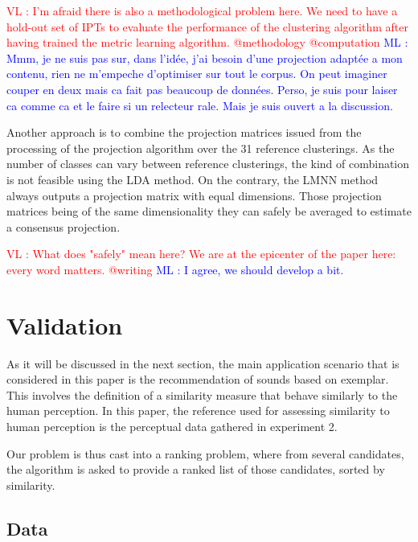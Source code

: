 \documentclass{article}
\newcommand{\ml}[1]{\textcolor{blue}{ML : #1}}
\newcommand{\vl}[1]{\textcolor{red}{VL : #1}}
\begin{document}
\vl{I'm afraid there is also a methodological problem here.
We need to have a hold-out set of IPTs to evaluate the performance of the clustering algorithm after having trained the metric learning algorithm.
@methodology @computation}
\ml{Mmm, je ne suis pas sur, dans l'idée, j'ai besoin d'une projection adaptée a mon contenu, rien ne m'empeche d'optimiser sur tout le corpus. On peut imaginer couper en deux mais ca fait pas beaucoup de données. Perso, je suis pour laiser ca comme ca et le faire si un relecteur rale. Mais je suis ouvert a la discussion.}

Another approach is to combine the projection matrices issued from the processing of the projection algorithm over the 31 reference clusterings. As the number of classes can vary between reference clusterings, the kind of combination is not feasible using the LDA method. On the contrary, the LMNN method always outputs a projection matrix with equal dimensions. Those projection matrices being of the same dimensionality they can safely be averaged to estimate a consensus projection.

\vl{What does "safely" mean here? We are at the epicenter of the paper here: every word matters. @writing}
\ml{I agree, we should develop a bit.}

\section{Validation}\label{sec:validation}

As it will be discussed in the next section, the main application scenario that is considered in this paper is the recommendation of sounds based on exemplar. This involves the definition of a similarity measure that behave similarly to the human perception. In this paper, the reference used for assessing similarity to human perception is the perceptual data gathered in experiment 2.

Our problem is thus cast into a ranking problem, where from several candidates, the algorithm is asked to provide a ranked list of those candidates, sorted by similarity.

\subsection{Data}
\end{document}
